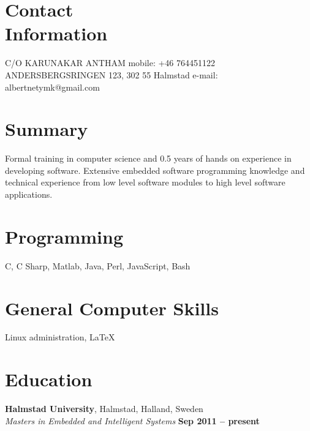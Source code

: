 \documentclass[margin,line]{resume}
\begin{document}
\begin{resume}
	\section{\mysidestyle Contact\\Information}
	C/O KARUNAKAR ANTHAM										\hfill mobile: +46 764451122         \vspace{0mm}\\\vspace{0mm}%
	ANDERSBERGSRINGEN 123, 302 55 Halmstad						\hfill e-mail:  albertnetymk@gmail.com  \vspace{0mm}\\\vspace{-4.5mm}%
	                                                 

	\section{\mysidestyle Summary}
		Formal training in computer science and 0.5 years of hands on experience in developing software.
		Extensive embedded software programming knowledge and technical experience from low level software modules to high level software 
		applications.

	\section{\mysidestyle Programming} 
		C, C Sharp, Matlab, Java, Perl, JavaScript, Bash

	\section{\mysidestyle General Computer Skills} 
		Linux administration, \LaTeX

	\section{\mysidestyle Education}

		\textbf{Halmstad University}, Halmstad, Halland, Sweden \vspace{2mm}\\\vspace{1mm}%
		\textsl{Masters in Embedded and Intelligent Systems} \hfill \textbf{ Sep 2011 -- present}\vspace{-3mm}\\\vspace{-1mm}%


\end{resume}
\end{document}
